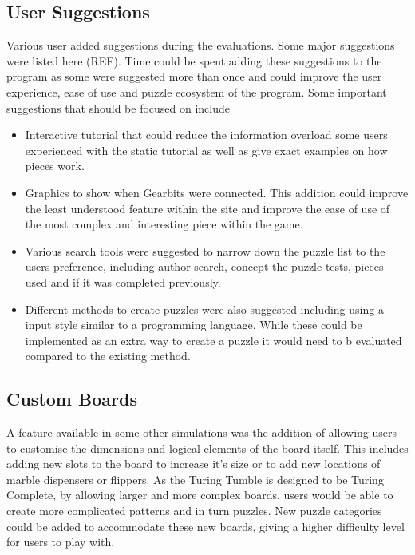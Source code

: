 \documentclass{l4proj}
\begin{document}
\subsection{User Suggestions}
Various user added suggestions during the evaluations. Some major suggestions were listed here (REF). Time could be spent adding these suggestions to the program as some were suggested more than once and could improve the user experience, ease of use and puzzle ecosystem of the program. Some important suggestions that should be focused on include 
\begin{itemize}
    \item Interactive tutorial that could reduce the information overload some users experienced with the static tutorial as well as give exact examples on how pieces work.
    \item Graphics to show when Gearbits were connected. This addition could improve the least understood feature within the site and improve the ease of use of the most complex and interesting piece within the game.
    \item Various search tools were suggested to narrow down the puzzle list to the users preference, including author search, concept the puzzle tests, pieces used and if it was completed previously.
    \item Different methods to create puzzles were also suggested including using a input style similar to a programming language. While these could be implemented as an extra way to create a puzzle it would need to b evaluated compared to the existing method.
\end{itemize}

\subsection{Custom Boards}
A feature available in some other simulations was the addition of allowing users to customise the dimensions and logical elements of the board itself. This includes adding new slots to the board to increase it's size or to add new locations of marble dispensers or flippers. As the Turing Tumble is designed to be Turing Complete, by allowing larger and more complex boards, users would be able to create more complicated patterns and in turn puzzles. New puzzle categories could be added to accommodate these new boards, giving a higher difficulty level for users to play with.  
\end{document}
